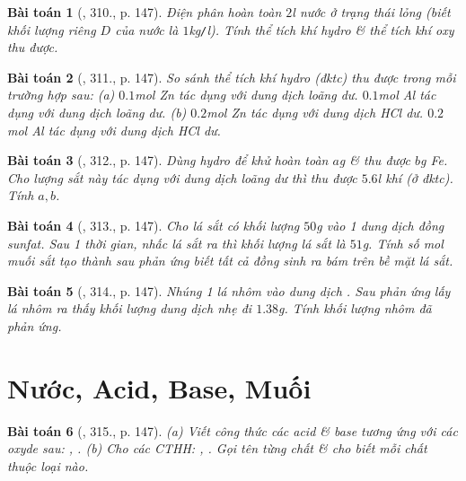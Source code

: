 \documentclass{article}
\newtheorem{baitoan}{Bài toán}
\begin{document}
\begin{baitoan}[\cite{An_400_BT_Hoa_Hoc_8_2020}, 310., p. 147]
	Điện phân hoàn toàn $2$\emph{l} nước ở trạng thái lỏng (biết khối lượng riêng $D$ của nước là $1$\emph{kg\texttt{/}l}). Tính thể tích khí hydro \& thể tích khí oxy thu được.
\end{baitoan}

\begin{baitoan}[\cite{An_400_BT_Hoa_Hoc_8_2020}, 311., p. 147]
	So sánh thể tích khí hydro (đktc) thu được trong mỗi trường hợp sau: (a) $0.1$\emph{mol Zn} tác dụng với dung dịch \emph{} loãng dư. $0.1$\emph{mol Al} tác dụng với dung dịch \emph{} loãng dư. (b) $0.2$\emph{mol Zn} tác dụng với dung dịch \emph{HCl} dư. $0.2$\emph{mol Al} tác dụng với dung dịch \emph{HCl} dư.
\end{baitoan}

\begin{baitoan}[\cite{An_400_BT_Hoa_Hoc_8_2020}, 312., p. 147]
	Dùng hydro để khử hoàn toàn $a$\emph{g} \emph{} \& thu được $b$\emph{g Fe}. Cho lượng sắt này tác dụng với dung dịch \emph{} loãng dư thì thu được $5.6$\emph{l} khí \emph{} (ở đktc). Tính $a,b$.
\end{baitoan}

\begin{baitoan}[\cite{An_400_BT_Hoa_Hoc_8_2020}, 313., p. 147]
	Cho lá sắt có khối lượng $50$\emph{g} vào 1 dung dịch đồng sunfat. Sau 1 thời gian, nhấc lá sắt ra thì khối lượng lá sắt là $51$\emph{g}. Tính số \emph{mol} muối sắt tạo thành sau phản ứng biết tất cả đồng sinh ra bám trên bề mặt lá sắt.
\end{baitoan}

\begin{baitoan}[\cite{An_400_BT_Hoa_Hoc_8_2020}, 314., p. 147]
	Nhúng 1 lá nhôm vào dung dịch \emph{}. Sau phản ứng lấy lá nhôm ra thấy khối lượng dung dịch nhẹ đi $1.38$\emph{g}. Tính khối lượng nhôm đã phản ứng.
\end{baitoan}


\section{Nước, Acid, Base, Muối}

\begin{baitoan}[\cite{An_400_BT_Hoa_Hoc_8_2020}, 315., p. 147]
	(a) Viết công thức các acid \& base tương ứng với các oxyde sau: \emph{, }. (b) Cho các CTHH: \emph{, }. Gọi tên từng chất \& cho biết mỗi chất thuộc loại nào.
\end{baitoan}
\end{document}
